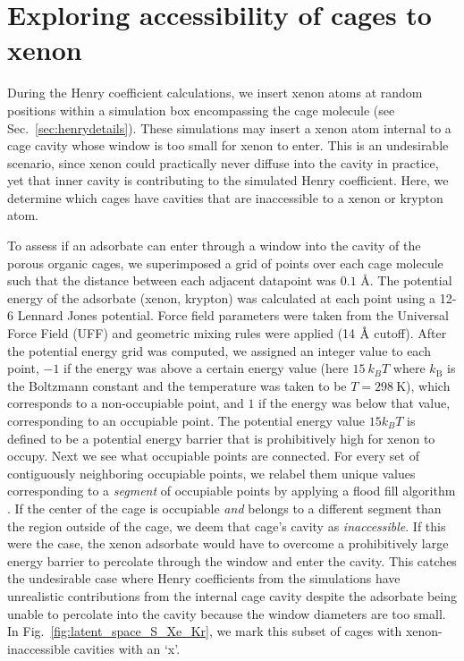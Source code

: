 \documentclass[journal=jacsat,manuscript=article]{achemso}
\newcommand{\angstrom}{\mbox{\normalfont\AA}}
\begin{document}
\clearpage

\section{Exploring accessibility of cages to xenon}
\label{sec:inaccessibility}

During the Henry coefficient calculations, we insert xenon atoms at random positions within a simulation box encompassing the cage molecule (see Sec.~\ref{sec:henrydetails}). These simulations may insert a xenon atom internal to a cage cavity whose window is too small for xenon to enter. This is an undesirable scenario, since xenon could practically never diffuse into the cavity in practice, yet that inner cavity is contributing to the simulated Henry coefficient. Here, we determine which cages have cavities that are inaccessible to a xenon or krypton atom.

To assess if an adsorbate can enter through a window into the cavity of the porous organic cages, we superimposed a grid of points over each cage molecule such that the distance between each adjacent datapoint was $0.1$ \AA. The potential energy of the adsorbate (xenon, krypton) was calculated at each point using a 12-6 Lennard Jones potential. Force field parameters were taken from the Universal Force Field (UFF) and geometric mixing rules were applied (14 $\angstrom$ cutoff). After the potential energy grid was computed, we assigned an integer value to each point, $-1$ if the energy was above a certain energy value (here $15 \ k_BT$ where $k_\text{B}$ is the Boltzmann constant and the temperature was taken to be $T = 298 \ \text{K}$), which corresponds to a non-occupiable point, and $1$ if the energy was below that value, corresponding to an occupiable point. The potential energy value $15k_B T$ is defined to be a potential energy barrier that is prohibitively high for xenon to occupy\cite{kim2012high}.
Next we see what occupiable points are connected. For every set of contiguously neighboring occupiable points, we relabel them unique values corresponding to a \emph{segment} of occupiable points by applying a flood fill algorithm \cite{martin2012accelerating,kim2012high}. If the center of the cage is occupiable \emph{and} belongs to a different segment than the region outside of the cage, we deem that cage's cavity as \emph{inaccessible}. If this were the case, the xenon adsorbate would have to overcome a prohibitively large energy barrier to percolate through the window and enter the cavity. This catches the undesirable case where Henry coefficients from the simulations have unrealistic contributions from the internal cage cavity despite the adsorbate being unable to percolate into the cavity because the window diameters are too small. In Fig.~\ref{fig:latent_space_S_Xe_Kr}, we mark this subset of cages with xenon-inaccessible cavities with an `x'.
\end{document}
